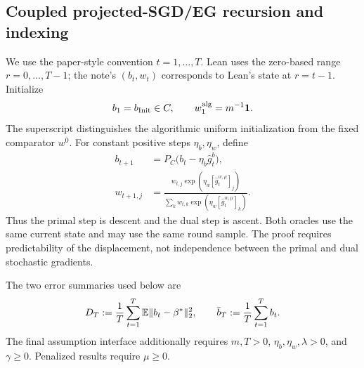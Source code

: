 \subsection{Coupled projected-SGD/EG recursion and indexing}

We use the paper-style convention $t=1,\ldots,T$.  Lean uses the zero-based
range $r=0,\ldots,T-1$; the note's $(b_t,w_t)$ corresponds to Lean's state at
$r=t-1$.  Initialize
\begin{equation}
  b_1=b_{\rm Init}\in C,
  \qquad
  w_1^{\rm alg}=m^{-1}\mathbf 1.
  \label{eq:algorithm-initialization}
\end{equation}
The superscript distinguishes the algorithmic uniform initialization from the
fixed comparator $w^0$.  For constant positive steps $\eta_b,\eta_w$, define
\begin{align}
  b_{t+1}
  &=P_C\bigl(b_t-\eta_b\widehat g_t^b\bigr),
  \label{eq:common-primal-update}\\
  w_{t+1,j}
  &=\frac{w_{t,j}\exp(\eta_w[\widehat g_t^{w,\mu}]_j)}
          {\sum_k w_{t,k}\exp(\eta_w[\widehat g_t^{w,\mu}]_k)}.
  \label{eq:common-dual-update}
\end{align}
Thus the primal step is descent and the dual step is ascent.  Both oracles use
the same current state and may use the same round sample.  The proof requires
predictability of the displacement, not independence between the primal and
dual stochastic gradients.

The two error summaries used below are
\begin{equation}
  D_T:=\frac1T\sum_{t=1}^T\mathbb{E}\|b_t-\beta^*\|_2^2,
  \qquad
  \bar b_T:=\frac1T\sum_{t=1}^T b_t.
  \label{eq:error-summaries}
\end{equation}
The final assumption interface additionally requires $m,T>0$,
$\eta_b,\eta_w,\lambda>0$, and $\gamma\ge0$.  Penalized results require
$\mu\ge0$.
